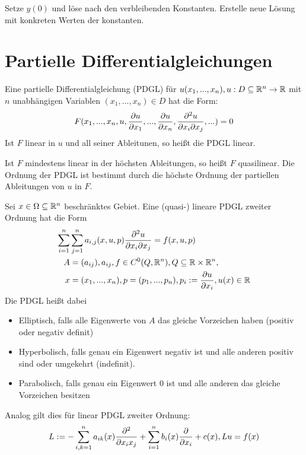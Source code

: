 \begin{definition}[Anfangswertproblem]
	Setze $y(0)$ und löse nach den verbleibenden Konstanten. Erstelle neue Lösung mit konkreten Werten der konstanten.
\end{definition}

\pagebreak

\section{Partielle Differentialgleichungen}

\begin{definition}
	Eine partielle Differentialgleichung (PDGL) für $u(x_1,...,x_n), u : D \subseteq \mathbb{R}^n \rightarrow \mathbb{R} $ mit $n$ unabhängigen Variablen $(x_1,...,x_n) \in D$ hat die Form:
	\begin{align*}
		F(x_1,...,x_n,u,\frac{\partial u}{\partial x_1},...,\frac{\partial u}{\partial x_n},\frac{\partial ^2u}{\partial x_i \partial x_j},...) = 0
	\end{align*}
	Ist $F$ linear in $u$ und all seiner Ableitunen, so heißt die PDGL linear.
	
	 Ist $F$ mindestens linear in der höchsten Ableitungen, so heißt $F$ quasilinear.
	 Die Ordnung der PDGL ist bestimmt durch die höchste Ordnung der partiellen Ableitungen von $u$ in $F$.
\end{definition}

\begin{definition}
	Sei $x \in \Omega \subseteq \mathbb{R}^n$ beschränktes Gebiet. Eine (quasi-) lineare PDGL zweiter Ordnung hat die Form
	\begin{align*}
		\sum_{i = 1}^n &\sum_{j=1}^{n} a_{i,j}(x,u,p) \frac{\partial ^2 u}{\partial x_i \partial x_j} = f(x, u, p) \\
		A &= (a_{ij}), a_{ij}, f \in C^{0}(Q,\mathbb{R}^n), Q \subseteq \mathbb{R} \times \mathbb{R}^n, \\
		x &= (x_1,...,x_n), p = (p_1,...,p_n), p_i := \frac{\partial u}{\partial x_i}, u(x) \in \mathbb{R}
	\end{align*}
	Die PDGL heißt dabei
	\begin{itemize}[noitemsep]
		\item Elliptisch, falls alle Eigenwerte von $A$ das gleiche Vorzeichen haben (positiv oder negativ definit)
		\item Hyperbolisch, falls genau ein Eigenwert negativ ist und alle anderen positiv sind oder umgekehrt (indefinit).
		\item Parabolisch, falls genau ein Eigenwert $0$ ist und alle anderen das gleiche Vorzeichen besitzen
	\end{itemize}
	Analog gilt dies für linear PDGL zweiter Ordnung:
	\begin{align*}
		L := -\sum_{i,k=1}^{n} a_{ik}(x) \frac{\partial ^2}{\partial x_i x_j} + \sum_{i = 1}^n b_i(x) \frac{\partial }{\partial x_i} + c(x), Lu = f(x)
	\end{align*}
\end{definition}

